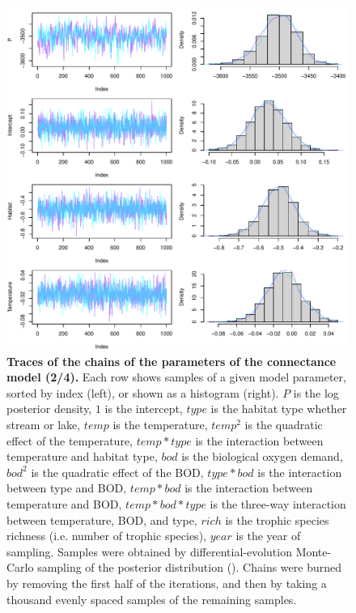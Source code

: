 \documentclass[11pt, oneside]{article}
\begin{document}
\begin{figure}[H]
\begin{center}
\includegraphics[page=2, width=1\linewidth]{b0_6_3/out_con/fig_tracePlot_beta.pdf}
\caption{
    \textbf{Traces of the chains of the parameters of the connectance model (2/4).}
    Each row shows samples of a given model parameter, sorted by index (left), or shown as a histogram (right).
    $P$ is the log posterior density, $1$ is the intercept, $type$ is the habitat type whether stream or lake, $temp$ is the temperature, $temp^2$ is the quadratic effect of the temperature, $temp * type$ is the interaction between temperature and habitat type, $bod$ is the biological oxygen demand, $bod^2$ is the quadratic effect of the BOD, $type * bod$ is the interaction between type and BOD, $temp * bod$ is the interaction between temperature and BOD, $temp * bod * type$ is the three-way interaction between temperature, BOD, and type, $rich$ is the trophic species richness (i.e. number of trophic species), $year$ is the year of sampling.
    Samples were obtained by differential-evolution Monte-Carlo sampling of the posterior distribution (\cite{TerBraak2006}).
    Chains were burned by removing the first half of the iterations, and then by taking a thousand evenly spaced samples of the remaining samples.
}
\end{center}
\end{figure}
\end{document}
